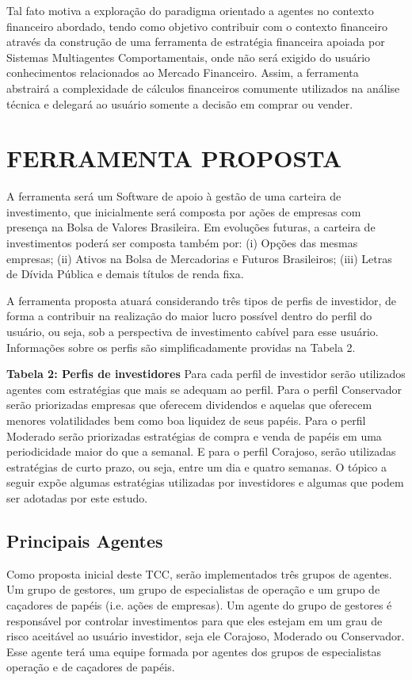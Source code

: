 Tal fato motiva a exploração do paradigma orientado a agentes no contexto financeiro abordado, tendo como objetivo contribuir com o contexto financeiro através da construção de uma ferramenta de estratégia financeira apoiada por Sistemas Multiagentes Comportamentais, onde não será exigido do usuário conhecimentos relacionados ao Mercado Financeiro. Assim, a ferramenta abstrairá a complexidade de cálculos financeiros comumente utilizados na análise técnica e delegará ao usuário somente a decisão em comprar ou vender.

\section{FERRAMENTA PROPOSTA}

A ferramenta será um Software de apoio à gestão de uma carteira de investimento, que inicialmente será composta por ações de empresas com presença na Bolsa de Valores Brasileira. Em evoluções futuras, a carteira de investimentos poderá ser composta também por: (i) Opções das mesmas empresas; (ii) Ativos na Bolsa de Mercadorias e Futuros Brasileiros; (iii) Letras de Dívida Pública e demais títulos de renda fixa. 

 A ferramenta proposta atuará considerando três tipos de perfis de investidor, de forma a contribuir na realização do maior lucro possível dentro do perfil do usuário, ou seja, sob a perspectiva de investimento cabível para esse usuário. Informações sobre os perfis são simplificadamente providas na Tabela 2.

 \textbf{Tabela 2: Perfis de investidores}
Para cada perfil de investidor serão utilizados agentes com estratégias que mais se adequam ao perfil. Para o perfil Conservador serão priorizadas empresas que oferecem dividendos e aquelas que oferecem menores volatilidades bem como boa liquidez de seus papéis. Para o perfil Moderado serão priorizadas estratégias de compra e venda de papéis em uma periodicidade maior do que a semanal. E para o perfil Corajoso, serão utilizadas estratégias de curto prazo, ou seja, entre um dia e quatro semanas. O tópico a seguir expõe algumas estratégias utilizadas por investidores e algumas que podem ser adotadas por este estudo.

\subsection{Principais Agentes}

Como proposta inicial deste TCC, serão implementados três grupos de agentes. Um grupo de gestores, um grupo de especialistas de operação e um grupo de caçadores de papéis (i.e. ações de empresas). Um agente do grupo de gestores é responsável por controlar investimentos para que eles estejam em um grau de risco aceitável ao usuário investidor, seja ele Corajoso, Moderado ou Conservador. Esse agente terá uma equipe formada por agentes dos grupos de especialistas operação e de caçadores de papéis.

